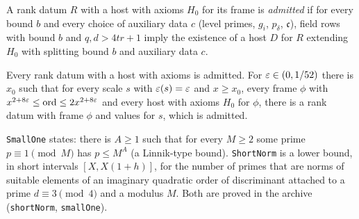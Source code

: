 \begin{definition}\label{host:admitted}
A rank datum $R$ with a host with axioms $H_0$ for its frame is
\emph{admitted} if for every bound $b$ and every choice of auxiliary data
$c$ (level primes, $g_i$, $p_{\delta}$, $\mathfrak c$), field rows with bound
$b$ and $q,d>4tr+1$ imply the existence of a host $D$ for $R$ extending
$H_0$ with splitting bound $b$ and auxiliary data $c$.
\end{definition}

\begin{lemma}\label{host:adm-classes}
Every rank datum with a host with axioms is admitted. For $\varepsilon\in(0,1/52)$
there is $x_0$ such that for every scale $s$ with $\varepsilon(s)=\varepsilon$ and
$x\ge x_0$, every frame $\phi$ with $x^{2+8\varepsilon}\le\mathrm{ord}\le
2x^{2+8\varepsilon}$ and every host with axioms $H_0$ for $\phi$, there is a rank
datum with frame $\phi$ and values for $s$, which is admitted.
\end{lemma}

\begin{definition}\label{host:short-norm}
\texttt{SmallOne} states: there is $A\ge1$ such that for every $M\ge2$ some
prime $p\equiv1\pmod M$ has $p\le M^A$ (a Linnik-type bound).
\texttt{ShortNorm} is a lower bound, in short intervals $[X,X(1+h)]$, for
the number of primes that are norms of suitable elements of an imaginary
quadratic order of discriminant attached to a prime $d\equiv3\pmod4$ and a
modulus $M$. Both are proved in the archive (\texttt{shortNorm},
\texttt{smallOne}).
\end{definition}

